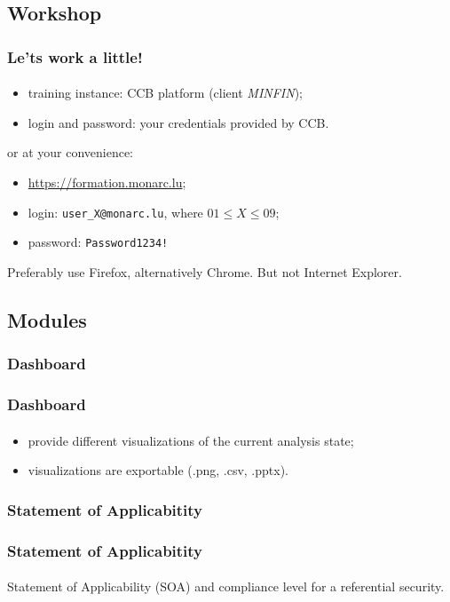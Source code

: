 \subsection{Workshop}
\begin{frame}
    \frametitle{Le'ts work a little!}
    \framesubtitle{}
    \begin{itemize}
      \item training instance: CCB platform (client \textit{MINFIN});
      \item login and password: your credentials provided by CCB.
    \end{itemize}
    
    \bigskip
    
    or at your convenience:
    \begin{itemize}
        \item \url{https://formation.monarc.lu};
        \item login: \texttt{user\_X@monarc.lu}, where $01 \leq X \leq 09$;
        \item password: \texttt{Password1234!}
    \end{itemize}

    \bigskip
    Preferably use Firefox, alternatively Chrome. But not Internet Explorer.
\end{frame}



\subsection{Modules}
\subsubsection{Dashboard}
\begin{frame}
    \frametitle{Dashboard}
    \framesubtitle{}
    \begin{itemize}
        \item provide different visualizations of the current analysis state;
        \item visualizations are exportable (.png, .csv, .pptx).
    \end{itemize}
\end{frame}

\subsubsection{Statement of Applicabitity}
\begin{frame}
    \frametitle{Statement of Applicabitity}
    \framesubtitle{}
    Statement of Applicability (SOA) and compliance level for a referential security.
\end{frame}

